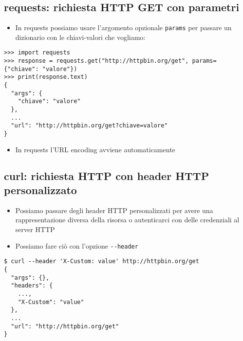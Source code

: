 \documentclass{beamer}
\newcommand{\code}[1]{\mbox{\texttt{#1}}}
\begin{document}
\subsection*{requests: richiesta HTTP GET con parametri}
\begin{frame}{\insertsection}{\insertsubsection}
\begin{itemize}
\item In requests possiamo usare l'argomento opzionale \code{params} per
passare un dizionario con le chiavi-valori che vogliamo:
\end{itemize}
{\tiny
\begin{verbatim}
>>> import requests
>>> response = requests.get("http://httpbin.org/get", params={"chiave": "valore"})
>>> print(response.text)
{
  "args": {
    "chiave": "valore"
  },
  ...
  "url": "http://httpbin.org/get?chiave=valore"
}
\end{verbatim}
}
\begin{itemize}
\item In requests l'URL encoding avviene automaticamente
\end{itemize}
\end{frame}

\subsection*{curl: richiesta HTTP con header HTTP personalizzato}
\begin{frame}{\insertsection}{\insertsubsection}
\begin{itemize}
\item Possiamo passare degli header HTTP personalizzati per avere una
rappresentazione diversa della risorsa o autenticarci con delle credenziali
al server HTTP
\item Possiamo fare ciò con l'opzione \verb|--header|
\end{itemize}
{\tiny
\begin{verbatim}
$ curl --header 'X-Custom: value' http://httpbin.org/get
{
  "args": {},
  "headers": {
    ...,
    "X-Custom": "value"
  },
  ...
  "url": "http://httpbin.org/get"
}
\end{verbatim}
}
\end{frame}
\end{document}

